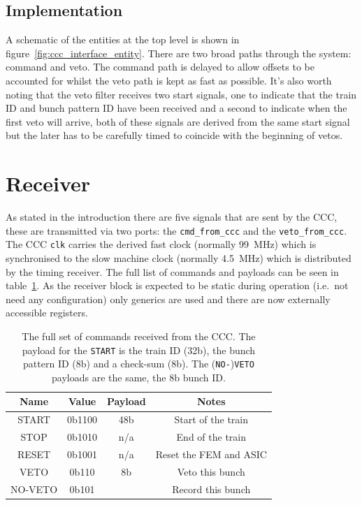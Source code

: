 \subsection{Implementation} %
\label{sub:top_implementation}
A schematic of the entities at the top level is shown in figure~\ref{fig:ccc_interface_entity}. There are two broad paths through the system: command and veto. The command path is delayed to allow offsets to be accounted for whilst the veto path is kept as fast as possible. It's also worth noting that the veto filter receives two start signals, one to indicate that the train ID and bunch pattern ID have been received and a second to indicate when the first veto will arrive, both of these signals are derived from the same start signal but the later has to be carefully timed to coincide with the beginning of vetos.

\section{Receiver} %
\label{sec:receiver}
As stated in the introduction there are five signals that are sent by the CCC, these are transmitted via two ports: the \texttt{cmd\_from\_ccc} and the \texttt{veto\_from\_ccc}. The CCC \texttt{clk} carries the derived fast clock (normally 99~MHz) which is synchronised to the slow machine clock (normally 4.5~MHz) which is distributed by the timing receiver. The full list of commands and payloads can be seen in table~\ref{tab:ccc_commands}. As the receiver block is expected to be static during operation (i.e.\ not need any configuration) only generics are used and there are now externally accessible registers.
\begin{table}[htbp]
  \begin{center}
  \begin{tabular}{c | c | c | c}
    Name     & Value  & Payload & Notes \\
    \hline
    START    & 0b1100 & 48b     & Start of the train \\
    STOP     & 0b1010 & n/a     & End of the train \\
    RESET    & 0b1001 & n/a     & Reset the FEM and ASIC \\
    \hline
    VETO     & 0b110  & 8b      & Veto this bunch \\
    NO-VETO  & 0b101  &         & Record this bunch \\
  \end{tabular}
  \end{center}
  \caption{The full set of commands received from the CCC. The payload for the \texttt{START} is the train ID (32b), the bunch pattern ID (8b) and a check-sum (8b). The (\texttt{NO-})\texttt{VETO} payloads are the same, the 8b bunch ID.}
  \label{tab:ccc_commands}
\end{table}

